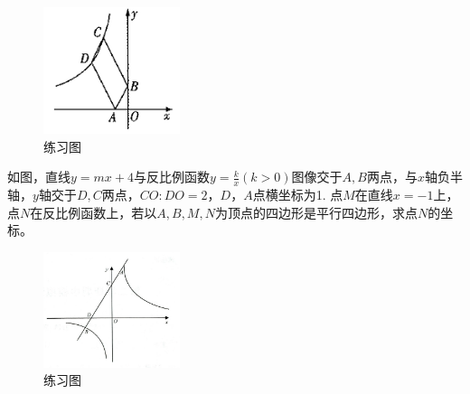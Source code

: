 \documentclass{ecnuthesis}
\begin{document}
\begin{figure}[H]
\centering
\includegraphics[width=4cm]{picture/670.png}
\caption{练习图}
\end{figure}
\begin{problem}
    如图，直线$y=mx+4$与反比例函数$y=\frac{k}{x}(k>0)$图像交于$A,B$两点，与$x$轴负半轴，$y$轴交于$D,C$两点，$CO:DO=2$，$D$，$A$点横坐标为1.
    点$M$在直线$x=-1$上，点$N$在反比例函数上，若以$A,B,M,N$为顶点的四边形是平行四边形，求点$N$的坐标。
\end{problem}
\begin{figure}[H]
\centering
\includegraphics[width=4cm]{picture/6123.png}
\caption{练习图}
\end{figure}
\clearpage
\end{document}
